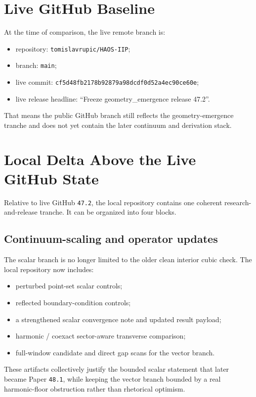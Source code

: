 \documentclass[11pt]{article}
\begin{document}
\section{Live GitHub Baseline}

At the time of comparison, the live remote branch is:
\begin{itemize}
\item repository: \texttt{tomislavrupic/HAOS-IIP};
\item branch: \texttt{main};
\item live commit: \texttt{cf5d48fb2178b92879a98dcdf0d52a4ec90ce60e};
\item live release headline: ``Freeze geometry\_emergence release 47.2''.
\end{itemize}

That means the public GitHub branch still reflects the geometry-emergence tranche and does not yet contain the later continuum and derivation stack.

\section{Local Delta Above the Live GitHub State}

Relative to live GitHub \texttt{47.2}, the local repository contains one coherent research-and-release tranche. It can be organized into four blocks.

\subsection{Continuum-scaling and operator updates}

The scalar branch is no longer limited to the older clean interior cubic check. The local repository now includes:
\begin{itemize}
\item perturbed point-set scalar controls;
\item reflected boundary-condition controls;
\item a strengthened scalar convergence note and updated result payload;
\item harmonic / coexact sector-aware transverse comparison;
\item full-window candidate and direct gap scans for the vector branch.
\end{itemize}

These artifacts collectively justify the bounded scalar statement that later became Paper \texttt{48.1}, while keeping the vector branch bounded by a real harmonic-floor obstruction rather than rhetorical optimism.
\end{document}
